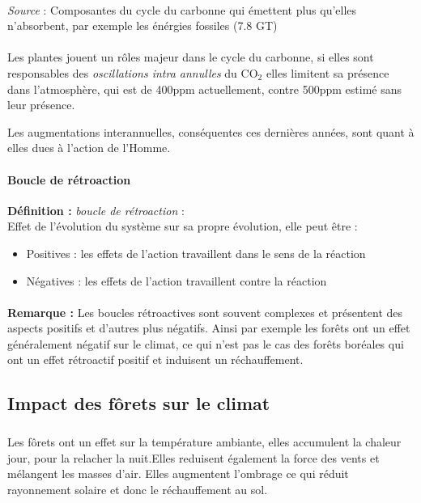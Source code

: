 \documentclass {article}
\begin{document}
\paragraph{}
\textit{Source} : Composantes du cycle du carbonne qui émettent plus qu'elles n'absorbent, par exemple les énérgies fossiles (7.8 GT)

\paragraph{}
Les plantes jouent un rôles majeur dans le cycle du carbonne, si elles sont responsables des \emph{oscillations intra annulles} du CO$_2$ elles limitent sa présence dans l'atmosphère, qui est de 400ppm actuellement, contre 500ppm estimé sans leur présence.

Les augmentations interannuelles, conséquentes ces dernières années, sont quant à elles dues à l'action de l'Homme.

\paragraph{Boucle de rétroaction}
\textbf{Définition : } \textit{boucle de rétroaction} :
\\ Effet de l'évolution du système sur sa propre évolution, elle peut être :
\begin{itemize}
\item Positives : les effets de l'action travaillent dans le sens de la réaction
\item Négatives : les effets de l'action travaillent contre la réaction
\end{itemize}

\paragraph{}
\textbf{Remarque : } Les boucles rétroactives sont souvent complexes et présentent des aspects positifs et d'autres plus négatifs.
Ainsi par exemple les forêts ont un effet généralement négatif sur le climat, ce qui n'est pas le cas des forêts boréales qui ont un effet rétroactif positif et induisent un réchauffement. 

\subsection{Impact des fôrets sur le climat}
\subparagraph{}
Les fôrets ont un effet sur la température ambiante, elles accumulent la chaleur jour, pour la relacher la nuit.Elles reduisent également la force des vents et mélangent les masses d'air. Elles augmentent l'ombrage ce qui réduit rayonnement solaire et donc le réchauffement au sol.
\end{document}
